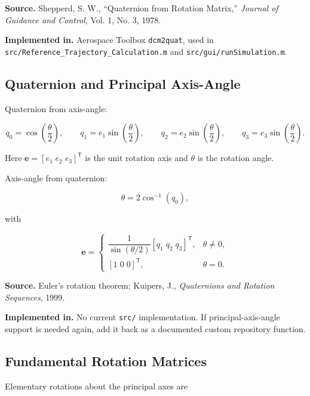 \documentclass[11pt]{article}
\newcommand{\vect}[1]{\boldsymbol{#1}}
\newcommand{\transpose}{\mathsf{T}}
\begin{document}
\textbf{Source.} Shepperd, S. W., ``Quaternion from Rotation Matrix,''
\emph{Journal of Guidance and Control}, Vol. 1, No. 3, 1978.

\textbf{Implemented in.} Aerospace Toolbox \texttt{dcm2quat}, used in
\texttt{src/Reference\_Trajectory\_Calculation.m} and
\texttt{src/gui/runSimulation.m}.

\subsection{Quaternion and Principal Axis-Angle}

Quaternion from axis-angle:

\begin{equation}
q_0 = \cos\left(\frac{\theta}{2}\right), \qquad
q_1 = e_1 \sin\left(\frac{\theta}{2}\right), \qquad
q_2 = e_2 \sin\left(\frac{\theta}{2}\right), \qquad
q_3 = e_3 \sin\left(\frac{\theta}{2}\right).
\end{equation}

Here $\vect{e} = [e_1\; e_2\; e_3]^\transpose$ is the unit rotation axis
and $\theta$ is the rotation angle.

Axis-angle from quaternion:

\begin{equation}
\theta = 2 \cos^{-1}(q_0),
\end{equation}

with

\begin{equation}
\vect{e} =
\begin{cases}
\dfrac{1}{\sin(\theta/2)} [q_1\; q_2\; q_3]^\transpose, & \theta \neq 0, \\
[1\; 0\; 0]^\transpose, & \theta = 0.
\end{cases}
\end{equation}

\textbf{Source.} Euler's rotation theorem; Kuipers, J.,
\emph{Quaternions and Rotation Sequences}, 1999.

\textbf{Implemented in.} No current \texttt{src/} implementation. If
principal-axis-angle support is needed again, add it back as a documented
custom repository function.

\subsection{Fundamental Rotation Matrices}

Elementary rotations about the principal axes are
\end{document}

